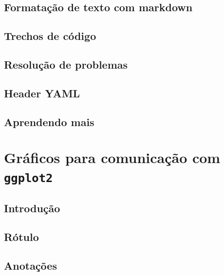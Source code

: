 \documentclass[
]{latex/krantz}
\theoremstyle{definition}
\theoremstyle{definition}
\theoremstyle{definition}
\theoremstyle{definition}
\theoremstyle{remark}
\begin{document}
\hypertarget{formatauxe7uxe3o-de-texto-com-markdown}{%
\section{Formatação de texto com markdown}\label{formatauxe7uxe3o-de-texto-com-markdown}}

\hypertarget{trechos-de-cuxf3digo}{%
\section{Trechos de código}\label{trechos-de-cuxf3digo}}

\hypertarget{resoluuxe7uxe3o-de-problemas}{%
\section{Resolução de problemas}\label{resoluuxe7uxe3o-de-problemas}}

\hypertarget{header-yaml}{%
\section{Header YAML}\label{header-yaml}}

\hypertarget{aprendendo-mais-1}{%
\section{Aprendendo mais}\label{aprendendo-mais-1}}

\hypertarget{gruxe1ficos-para-comunicauxe7uxe3o-com-ggplot2}{%
\chapter{\texorpdfstring{Gráficos para comunicação com \texttt{ggplot2}}{Gráficos para comunicação com ggplot2}}\label{gruxe1ficos-para-comunicauxe7uxe3o-com-ggplot2}}

\hypertarget{introduuxe7uxe3o-18}{%
\section{Introdução}\label{introduuxe7uxe3o-18}}

\hypertarget{ruxf3tulo}{%
\section{Rótulo}\label{ruxf3tulo}}

\hypertarget{anotauxe7uxf5es}{%
\section{Anotações}\label{anotauxe7uxf5es}}
\end{document}
